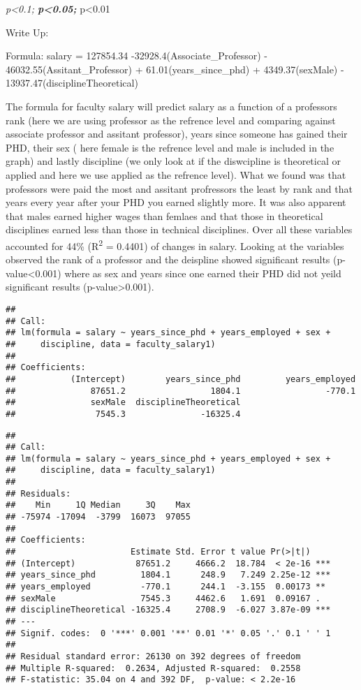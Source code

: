 \documentclass[]{article}
\begin{document}
\emph{p\textless{}0.1; \textbf{p\textless{}0.05; }}p\textless{}0.01

Write Up:

Formula: salary = 127854.34 -32928.4(Associate\_Professor) -
46032.55(Assitant\_Professor) + 61.01(years\_since\_phd) +
4349.37(sexMale) - 13937.47(disciplineTheoretical)

The formula for faculty salary will predict salary as a function of a
professors rank (here we are using professor as the refrence level and
comparing against associate professor and assitant professor), years
since someone has gained their PHD, their sex ( here female is the
refrence level and male is included in the graph) and lastly discipline
(we only look at if the diswcipline is theoretical or applied and here
we use applied as the refrence level). What we found was that professors
were paid the most and assitant profressors the least by rank and that
years every year after your PHD you earned slightly more. It was also
apparent that males earned higher wages than femlaes and that those in
theoretical disciplines earned less than those in technical disciplines.
Over all these variables accounted for 44\% (R\textsuperscript{2} =
0.4401) of changes in salary. Looking at the variables observed the rank
of a professor and the deispline showed significant results
(p-value\textless{}0.001) where as sex and years since one earned their
PHD did not yeild significant results (p-value\textgreater{}0.001).

\begin{verbatim}
## 
## Call:
## lm(formula = salary ~ years_since_phd + years_employed + sex + 
##     discipline, data = faculty_salary1)
## 
## Coefficients:
##           (Intercept)        years_since_phd         years_employed  
##               87651.2                 1804.1                 -770.1  
##               sexMale  disciplineTheoretical  
##                7545.3               -16325.4
\end{verbatim}

\begin{verbatim}
## 
## Call:
## lm(formula = salary ~ years_since_phd + years_employed + sex + 
##     discipline, data = faculty_salary1)
## 
## Residuals:
##    Min     1Q Median     3Q    Max 
## -75974 -17094  -3799  16073  97055 
## 
## Coefficients:
##                       Estimate Std. Error t value Pr(>|t|)    
## (Intercept)            87651.2     4666.2  18.784  < 2e-16 ***
## years_since_phd         1804.1      248.9   7.249 2.25e-12 ***
## years_employed          -770.1      244.1  -3.155  0.00173 ** 
## sexMale                 7545.3     4462.6   1.691  0.09167 .  
## disciplineTheoretical -16325.4     2708.9  -6.027 3.87e-09 ***
## ---
## Signif. codes:  0 '***' 0.001 '**' 0.01 '*' 0.05 '.' 0.1 ' ' 1
## 
## Residual standard error: 26130 on 392 degrees of freedom
## Multiple R-squared:  0.2634, Adjusted R-squared:  0.2558 
## F-statistic: 35.04 on 4 and 392 DF,  p-value: < 2.2e-16
\end{verbatim}
\end{document}
